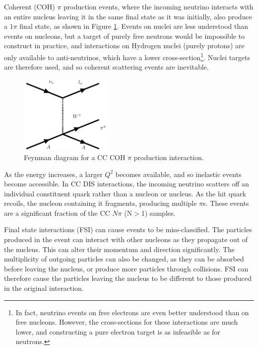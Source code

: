 Coherent (COH) $\pi$ production events, where the incoming neutrino interacts with an entire nucleus leaving it in the same final state as it was initially, also produce a $1\pi$ final state, as shown in Figure \ref{COHdiagram}. Events on nuclei are less understood than events on nucleons, but a target of purely free neutrons would be impossible to construct in practice, and interactions on Hydrogen nuclei (purely protons) are only available to anti-neutrinos, which have a lower cross-section\footnote{In fact, neutrino events on free electrons are even better understood than on free nucleons. However, the cross-sections for these interactions are much lower, and constructing a pure electron target is as infeasible as for neutrons.}. Nuclei targets are therefore used, and so coherent scattering events are inevitable.

\begin{figure}[!htbp]
\vspace{20pt}
\centering
\includegraphics*[width=0.4\textwidth,clip]{figs/feynmanCOH}
\caption{Feynman diagram for a CC COH $\pi$ production interaction. 
} \label{COHdiagram}
\end{figure}

As the energy increases, a larger $Q^2$ becomes available, and so inelastic events become accessible. In CC DIS interactions, the incoming neutrino scatters off an individual constituent quark rather than a nucleon or nucleus. As the hit quark recoils, the nucleon containing it fragments, producing multiple $\pi$s. These events are a significant fraction of the CC $N\pi$ (N$>$1) samples.

Final state interactions (FSI) can cause events to be miss-classified. The particles produced in the event can interact with other nucleons as they propagate out of the nucleus. This can alter their momentum and direction significantly. The multiplicity of outgoing particles can also be changed, as they can be absorbed before leaving the nucleus, or produce more particles through collisions. FSI can therefore cause the particles leaving the nucleus to be different to those produced in the original interaction.

